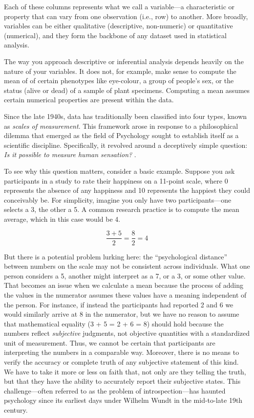 Each of these columns represents what we call a variable—a characteristic or property that can vary from one observation (i.e., row) to another. More broadly, variables can be either qualitative (descriptive, non-numeric) or quantitative (numerical), and they form the backbone of any dataset used in statistical analysis.

The way you approach descriptive or inferential analysis depends heavily on the nature of your variables. It does not, for example, make sense to compute the mean of 
of certain phenotypes like eye-colour, a group of people's sex, or the status (alive or dead) of a sample of plant specimens. Computing a mean assumes certain numerical properties are present within the data.

Since the late 1940s, data has traditionally been classified into four types, known as \textit{scales of measurement}. This framework arose in response to a philosophical dilemma that emerged as the field of Psychology sought to establish itself as a scientific discipline. Specifically, it revolved around a deceptively simple question: \textit{Is it possible to measure human sensation?} \parencite[p. 677]{Stevens1946}.

To see why this question matters, consider a basic example. Suppose you ask participants in a study to rate their happiness on a 11-point scale, where 0 represents the absence of any happiness and 10 represents the happiest they could
conceivably be. For simplicity, imagine you only have two participants—one selects a 3, the other a 5. A common research practice is to compute the mean average, which in this case would be 4. 

\begin{equation}
\frac{3 + 5}{2} = \frac{8}{2} = 4
\end{equation}

But there is a potential problem lurking here: the ``psychological distance'' between numbers on the scale may not be consistent across individuals. What one person considers a 5, another might interpret as a 7, or a 3, or some other value. That becomes an issue when we calculate a mean because the process of adding the values in the numerator assumes these values have a meaning independent of the person. For instance, if instead the participants had reported 2 and 6 we would similarly arrive at 8 in the numerator, but we have no reason to assume that mathematical equality (3 + 5 = 2 + 6 = 8) should hold because the numbers reflect \textit{subjective} judgments, not objective quantities with a standardized unit of measurement. Thus, we cannot be certain that participants are interpreting the numbers in a comparable way. Moreover, there is no means to verify the accuracy or complete truth of any subjective statement of this kind. We have to take it more or less on faith that, not only are they telling the truth, but that they have the ability to accurately report their subjective states. This challenge—often referred to as the problem of introspection—has haunted psychology since its earliest days under Wilhelm Wundt in the mid-to-late 19th century. 

